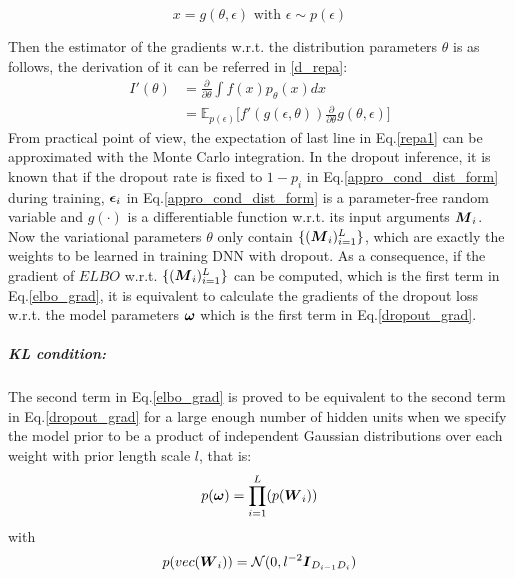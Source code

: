 \[
x = g(\theta, \epsilon)  \text{ with } \epsilon \sim p(\epsilon)
\]

Then the estimator of the gradients w.r.t. the distribution parameters $\theta$ is as follows, the derivation of it can be referred in \ref{d_repa}:
\begin{equation}
\begin{aligned} \label{repa1}
I'(\theta) &= \frac{\partial}{\partial \theta} \int f(x) p_{\theta}(x) dx \\
&= \mathbb E_{p(\epsilon)}\big[ f'(g(\epsilon, \theta))\frac{\partial}{\partial \theta}g(\theta, \epsilon)\big] 
\end{aligned}
\end{equation} 
From practical point of view, the expectation of last line in Eq.\ref{repa1} can be approximated with the Monte Carlo integration. In the dropout inference, it is known that if the dropout rate is fixed to $1- p_{i}$ in Eq.\ref{appro_cond_dist_form} during training, $\boldsymbol \epsilon_{i}$ in Eq.\ref{appro_cond_dist_form} is a parameter-free random variable and $g(\cdot)$ is a differentiable function w.r.t. its input arguments $\boldsymbol M_{i}$. Now the variational parameters $\theta$ only contain $\{(\boldsymbol M_{i})_{i=1}^{L} \}$, which are exactly the weights to be learned in training DNN with dropout. As a consequence, if the gradient of $ELBO$ w.r.t. $\{(\boldsymbol M_{i})_{i=1}^{L}\}$ can be computed, which is the first term in Eq.\ref{elbo_grad}, it is equivalent to calculate the gradients of the dropout loss w.r.t. the model parameters $\boldsymbol \omega$ which is the first term in Eq.\ref{dropout_grad}.

\subparagraph{KL condition:} The second term in Eq.\ref{elbo_grad} is proved to be equivalent to the second term in Eq.\ref{dropout_grad} for a large enough number of hidden units when we specify the model prior to be a product of independent Gaussian distributions over each weight with prior length scale $l$, that is:
\[p(\boldsymbol \omega) = \prod_{i=1}^{L}(p(\boldsymbol W_{i})) \]
with
\[
p(vec(\boldsymbol W_{i})) = \mathcal N(0, l^{-2}\boldsymbol I_{D_{i-1} D_{i}})
\]

